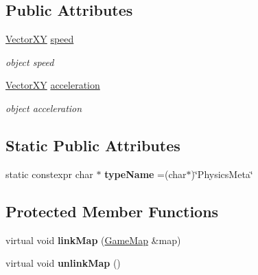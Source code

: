 \subsection*{Public Attributes}
\begin{DoxyCompactItemize}
\item 
\hypertarget{classObjectPhysicsMeta_a9d6fae5e4518766e715781227e3fb9a9}{}\hyperlink{classVectorXY}{Vector\+X\+Y} \hyperlink{classObjectPhysicsMeta_a9d6fae5e4518766e715781227e3fb9a9}{speed}\label{classObjectPhysicsMeta_a9d6fae5e4518766e715781227e3fb9a9}

\begin{DoxyCompactList}\small\item\em object speed \end{DoxyCompactList}\item 
\hypertarget{classObjectPhysicsMeta_ab2ef030e0178008c40520e615790a854}{}\hyperlink{classVectorXY}{Vector\+X\+Y} \hyperlink{classObjectPhysicsMeta_ab2ef030e0178008c40520e615790a854}{acceleration}\label{classObjectPhysicsMeta_ab2ef030e0178008c40520e615790a854}

\begin{DoxyCompactList}\small\item\em object acceleration \end{DoxyCompactList}\end{DoxyCompactItemize}
\subsection*{Static Public Attributes}
\begin{DoxyCompactItemize}
\item 
\hypertarget{classObjectPhysicsMeta_a6017a1245eb08ec3e829b2c1c08aeede}{}static constexpr char $\ast$ {\bfseries type\+Name} =(char$\ast$)\char`\"{}Physics\+Meta\char`\"{}\label{classObjectPhysicsMeta_a6017a1245eb08ec3e829b2c1c08aeede}

\end{DoxyCompactItemize}
\subsection*{Protected Member Functions}
\begin{DoxyCompactItemize}
\item 
\hypertarget{classObjectPhysicsMeta_a429712351080fbccba9fb32b11ab1072}{}virtual void {\bfseries link\+Map} (\hyperlink{classGameMap}{Game\+Map} \&map)\label{classObjectPhysicsMeta_a429712351080fbccba9fb32b11ab1072}

\item 
\hypertarget{classObjectPhysicsMeta_a5e391ee1abaa3e04d3961a1c1e51c73b}{}virtual void {\bfseries unlink\+Map} ()\label{classObjectPhysicsMeta_a5e391ee1abaa3e04d3961a1c1e51c73b}

\end{DoxyCompactItemize}
